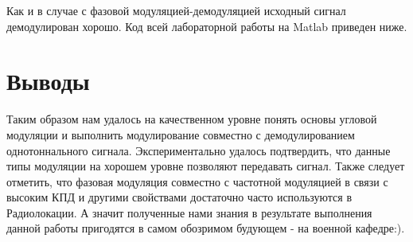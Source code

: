 Как и в случае с фазовой модуляцией-демодуляцией исходный сигнал демодулирован хорошо.
Код всей лабораторной работы на Matlab приведен ниже.


\parindent=1cm %

\section{Выводы}
Таким образом нам удалось на качественном уровне понять основы угловой модуляции и выполнить модулирование совместно с демодулированием однотоннального сигнала. Экспериментально удалось подтвердить, что данные типы модуляции на хорошем уровне позволяют передавать сигнал. Также следует отметить, что фазовая модуляция совместно с частотной модуляцией в связи с высоким КПД и другими свойствами достаточно часто используются в Радиолокации. А значит полученные нами знания в результате выполнения данной работы пригодятся в самом обозримом будующем - на военной кафедре:).   

